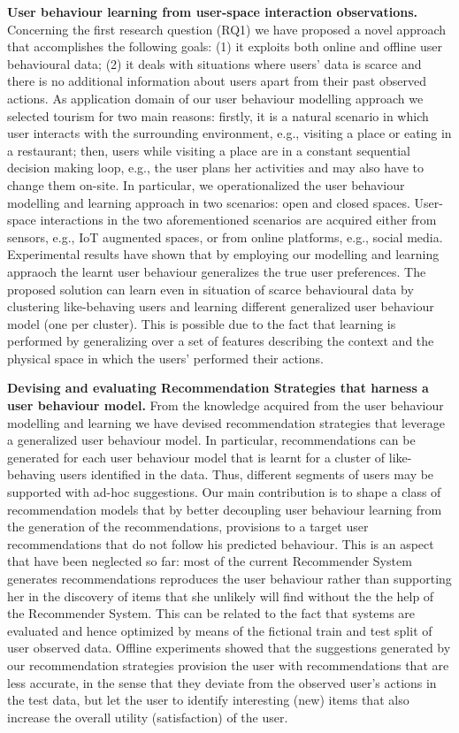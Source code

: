 \noindent \textbf{User behaviour learning from user-space interaction observations.} Concerning the first research question (RQ1) we have proposed a novel approach that accomplishes the following goals: (1) it exploits both online and offline user behavioural data; (2) it deals with situations where users' data is scarce and there is no additional information about users apart from their past observed actions. 
As application domain of our user behaviour modelling approach we selected tourism for two main reasons: firstly, it is a natural scenario in which user interacts with the surrounding environment, e.g., visiting a place or eating in a restaurant; then, users while visiting a place are in a constant sequential decision making loop, e.g., the user plans her activities and may also have to change them on-site.
In particular, we operationalized the user behaviour modelling and learning approach in two scenarios: open and closed spaces. User-space interactions in the two aforementioned scenarios are acquired either from sensors, e.g., IoT augmented spaces, or from online platforms, e.g., social media.
Experimental results have shown that by employing our modelling and learning appraoch the learnt user behaviour generalizes the true user preferences. The proposed solution can learn even in situation of scarce behavioural data by clustering like-behaving users and learning different generalized user behaviour model (one per cluster). This is possible due to the fact that learning is performed by generalizing over a set of features describing the context and the physical space in which the users' performed their actions. \newline

\noindent \textbf{Devising and evaluating Recommendation Strategies that harness a user behaviour model.} From the knowledge acquired from the user behaviour modelling and learning we have devised recommendation strategies that leverage a generalized user behaviour model. In particular, recommendations can be generated for each user behaviour model that is learnt for a cluster of like-behaving users identified in the data. Thus, different segments of users may be supported with ad-hoc suggestions. Our main contribution is to shape a class of recommendation models that by better decoupling user behaviour learning from the generation of the recommendations, provisions to a target user recommendations that do not follow his predicted behaviour. This is an aspect that have been neglected so far: most of the current Recommender System generates recommendations reproduces the user behaviour rather than supporting her in the discovery of items that she unlikely will find without the the help of the Recommender System. This can be related to the fact that systems are evaluated and hence optimized by means of the fictional train and test split of user observed data.
Offline experiments showed that the suggestions generated by our recommendation strategies provision the user with recommendations that are less accurate, in the sense that they deviate from the observed user's actions in the test data, but let the user to identify interesting (new) items that also increase the overall utility (satisfaction) of the user.

